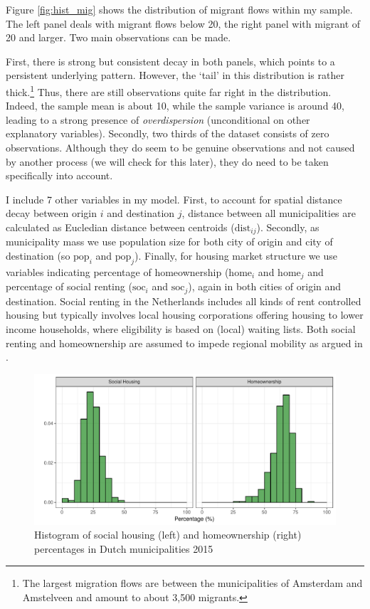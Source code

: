 \documentclass[12pt, parskip, abstracton,notitlepage]{scrartcl}
\begin{document}
Figure \ref{fig:hist_mig} shows the distribution of migrant
flows within my sample. The left panel deals with migrant
flows below 20, the right panel with migrant of 20 and
larger. Two main observations can be made.

First, there is strong but consistent decay in both panels,
which points to a persistent underlying pattern. However, the
`tail' in this distribution is rather thick.\footnote{The
	largest migration flows are between the municipalities of
	Amsterdam and Amstelveen and amount to about 3,500
	migrants.} Thus, there are still observations quite far
right in the distribution. Indeed, the sample mean is about
10, while the sample variance is around 40, leading to a
strong presence of \emph{overdispersion} (unconditional on
other explanatory variables).  Secondly, two thirds of the
dataset consists of zero observations. Although they do seem
to be genuine observations and not caused by another process
(we will check for this later), they do need to be taken
specifically into account.

I include 7 other variables in my model. First, to account for
spatial distance decay between origin $i$ and destination $j$,
distance between all municipalities are calculated as
Eucledian distance between centroids
($\text{dist}_{ij}$). Secondly, as municipality mass we use
population size for both city of origin and city of
destination (so $\text{pop}_i$ and $\text{pop}_j$). Finally,
for housing market structure we use variables indicating
percentage of homeownership ($\text{home}_i$ and
$\text{home}_j$ and percentage of social renting
($\text{soc}_i$ and $\text{soc}_j$), again in both cities of
origin and destination. Social renting in the Netherlands
includes all kinds of rent controlled housing but typically
involves local housing corporations offering housing to lower
income households, where eligibility is based on (local)
waiting lists. Both social renting and homeownership are
assumed to impede regional mobility as argued in
\citep{de2009homeownership}.

\begin{figure}[ht]\centering %
	\includegraphics[width=0.8\linewidth]{../fig/hist_housing.pdf}
	\caption{Histogram of social housing (left) and
		homeownership (right) percentages in Dutch municipalities
		2015}
	\label{fig:housing_mig}
\end{figure}
\end{document}
